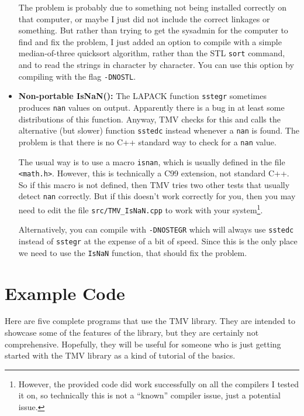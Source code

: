 \documentclass[twoside,letterpaper,11pt]{article}
\renewcommand{\tt}[1]{{\lstinline {#1}}}
\begin{document}
\begin{itemize}
The problem is probably due to something not being installed correctly on that
computer, or maybe I just did not include the correct linkages or something.  
But rather than trying to get the sysadmin for the computer to find and fix the problem, 
I just added an option to compile with a simple median-of-three
quicksort algorithm, rather than the STL \tt{sort} command, and to read the strings
in character by character.  You can use this option by compiling with the 
flag \texttt{-DNOSTL}.  

\item {\bf Non-portable IsNaN():}
The LAPACK function \tt{sstegr} sometimes produces \tt{nan} values on output.
Apparently there is a bug in at least some distributions of this function.
Anyway, TMV checks for this and calls the alternative (but slower) function
\tt{sstedc} instead whenever a \tt{nan} is found.  
The problem is that there is no C++ standard way to check
for a \tt{nan} value.  

The usual way is to use a macro \tt{isnan}, which is usually
defined in the file \tt{<math.h>}.  However, this is technically a C99 extension,
not standard C++.  So if this macro is not defined, then TMV tries two other
tests that usually detect \tt{nan} correctly.  But if this doesn't work correctly
for you, then you may need to edit the file \texttt{src/TMV\_IsNaN.cpp} to work
with your system\footnote{
However, the provided code did work successfully on all the compilers I 
tested it on, so technically this is not a ``known'' compiler issue, just a 
potential issue.}.

Alternatively, you can compile with \texttt{-DNOSTEGR} which will always
use \tt{sstedc} instead of \tt{sstegr} at the expense of a bit of speed.
Since this is the only place we need to use the \tt{IsNaN} function, that 
should fix the problem.

\end{itemize}


\section{Example Code}

Here are five complete programs that use the TMV library.  They are intended to showcase
some of the features of the library, but they are certainly not comprehensive.  Hopefully,
they will be useful for someone who is just getting started with the TMV library as a 
kind of tutorial of the basics.
\end{document}
